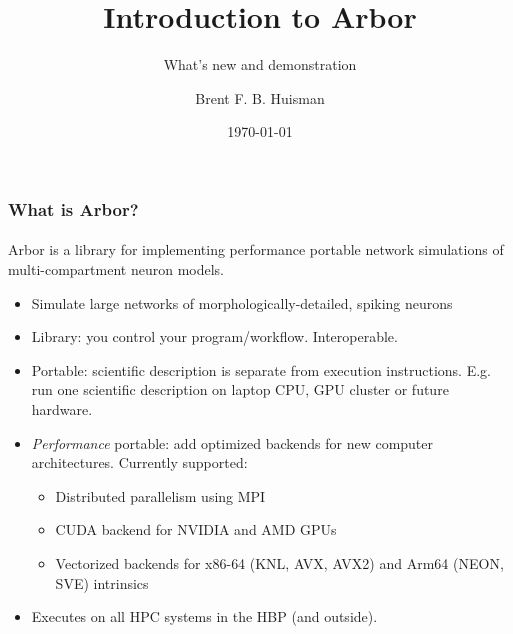 \documentclass[t,aspectratio=1610]{beamer}
\title{Introduction to Arbor}
\subtitle{What's new and demonstration}
\author{Brent F. B. Huisman}
\institute{Jülich Supercomputing Centre}
\date{\today}
\begin{document}

\small

\begin{frame}
    \frametitle{What is Arbor?}
    \framesubtitle{}
        Arbor is a library for implementing performance portable network simulations of multi-compartment neuron models.

        \begin{itemize}
        \item Simulate large networks of morphologically-detailed, spiking neurons
        \item Library: you control your program/workflow. Interoperable.
        \item Portable: scientific description is separate from execution instructions. E.g. run one scientific description on laptop CPU, GPU cluster or future hardware.
        \item \textit{Performance} portable: add optimized backends for new computer architectures. Currently supported:
            \begin{itemize}
            \item Distributed parallelism using MPI
            \item CUDA backend for NVIDIA and AMD GPUs
            \item Vectorized backends for x86-64 (KNL, AVX, AVX2) and Arm64 (NEON, SVE) intrinsics
            \end{itemize}
        \item Executes on all HPC systems in the HBP (and outside).
        \end{itemize}
\end{frame}
\end{document}
